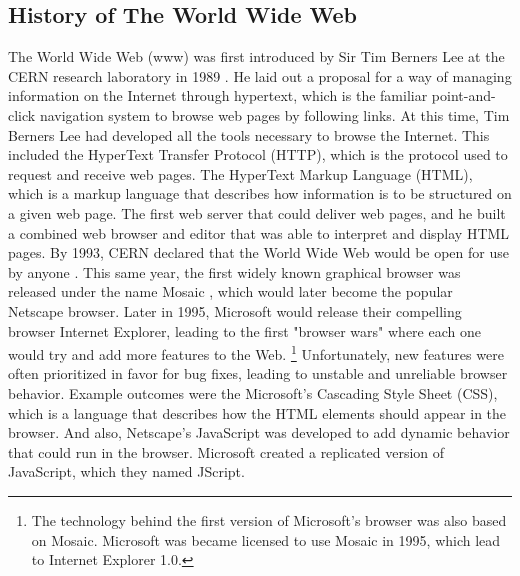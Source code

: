 \subsection{History of The World Wide Web}
The World Wide Web (www) was first introduced by Sir Tim Berners Lee at the CERN research laboratory in 1989 \cite{firstweb}. He laid out a proposal for a way of managing information on the Internet through hypertext, which is the familiar point-and-click navigation system to browse web pages by following links. At this time, Tim Berners Lee had developed all the tools necessary to browse the Internet. This included the HyperText Transfer Protocol (HTTP), which is the protocol used to request and receive web pages. The HyperText Markup Language (HTML), which is a markup language that describes how information is to be structured on a given web page. The first web server that could deliver web pages, and he built a combined web browser and editor that was able to interpret and display HTML pages. By 1993, CERN declared that the World Wide Web would be open for use by anyone \cite{historyWeb}. This same year, the first widely known graphical browser was released under the name Mosaic \cite{mosaic}, which would later become the popular Netscape browser. Later in 1995, Microsoft would release their compelling browser Internet Explorer, leading to the first "browser wars" where each one would try and add more features to the Web. \footnote{The technology behind the first version of Microsoft's browser was also based on Mosaic. Microsoft was became licensed to use Mosaic in 1995,\cite{iemosaic} which lead to Internet Explorer 1.0.} Unfortunately, new features were often prioritized in favor for bug fixes, leading to unstable and unreliable browser behavior. Example outcomes were the Microsoft's Cascading Style Sheet (CSS)\cite{css}, which is a language that describes how the HTML elements should appear in the browser. And also, Netscape's JavaScript \cite{jsHistory} was developed to add dynamic behavior that could run in the browser. Microsoft created a replicated version of JavaScript, which they named JScript.\cite{jscript}

